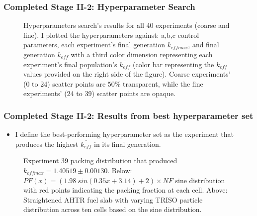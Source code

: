 \begin{frame}
    \frametitle{Completed Stage II-2: Hyperparameter Search}
    \begin{figure}[]
        \centering
        \caption{Hyperparameters search's results for all 40 experiments (coarse 
        and fine). I plotted the hyperparameters against: a,b,c control parameters, 
        each experiment's final generation $k_{eff max}$, and final generation 
        $\overline{k_{eff}}$ with a third color dimension representing each experiment's final 
        population's $\overline{k_{eff}}$ (color bar representing the $k_{eff}$ values 
        provided on the right side of the figure). Coarse experiments' (0 to 24) scatter points 
        are $50\%$ transparent, while the fine experiments' (24 to 39) scatter points 
        are opaque.}
    \end{figure}
\end{frame}

\begin{frame}
    \frametitle{Completed Stage II-2: Results from best hyperparameter set}
    \begin{itemize}
        \item I define the best-performing hyperparameter set as the experiment that produces 
        the highest $\overline{k_{eff}}$ in its final generation. 
    \end{itemize}
    \begin{figure}[]
        \centering
        \caption{Experiment 39 packing distribution that produced $k_{eff max} = 1.40519 \pm 0.00130$. 
        Below: $PF(x) = (1.98\ sin(0.35x+3.14)+2)  \times NF$ sine distribution with 
        red points indicating the packing fraction at each cell. 
        Above: Straightened AHTR fuel slab with varying TRISO particle 
        distribution across ten cells based on the sine distribution. }
        \label{fig:triso_distribution_sine_39}
    \end{figure}
\end{frame}

